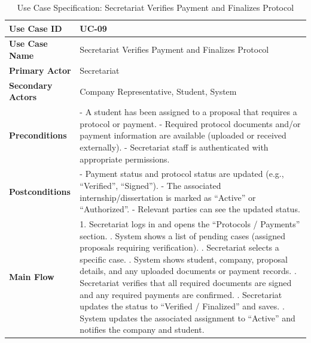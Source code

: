 \newpage

\newpage
\renewcommand{\arraystretch}{1.5} 
\begin{xltabular}{\textwidth}{|l|X|}
    \caption{Use Case Specification: Secretariat Verifies Payment and Finalizes Protocol} \label{tab:UC-09} \\
    
    \hline
    \textbf{Use Case ID} & UC-09 \\ \hline
    \textbf{Use Case Name} & Secretariat Verifies Payment and Finalizes Protocol \\ \hline
    \textbf{Primary Actor} & Secretariat \\ \hline
    \textbf{Secondary Actors} & Company Representative, Student, System \\ \hline
    \textbf{Preconditions} &
        - A student has been assigned to a proposal that requires a protocol or payment. \newline
        - Required protocol documents and/or payment information are available (uploaded or received externally). \newline
        - Secretariat staff is authenticated with appropriate permissions.
        \\ \hline
    \textbf{Postconditions} &
        - Payment status and protocol status are updated (e.g., “Verified”, “Signed”). \newline
        - The associated internship/dissertation is marked as “Active” or “Authorized”. \newline
        - Relevant parties can see the updated status.
        \\ \hline
    \textbf{Main Flow} &
        1. Secretariat logs in and opens the “Protocols / Payments” section. . System shows a list of pending cases (assigned proposals requiring verification). . Secretariat selects a specific case. . System shows student, company, proposal details, and any uploaded documents or payment records. . Secretariat verifies that all required documents are signed and any required payments are confirmed. . Secretariat updates the status to “Verified / Finalized” and saves. . System updates the associated assignment to “Active” and notifies the company and student. \\ \hline

\end{xltabular}
